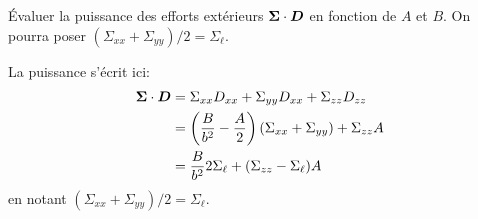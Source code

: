\documentclass[french,12pt]{exam}
\begin{document}
\begin{questions}
%
%



\question \'Evaluer la puissance des efforts extérieurs $\boldsymbol{\Sigma} \cdot \boldsymbol{D}$ en fonction de $A$ et $B$. On pourra poser $(\Sigma_{xx}+\Sigma_{yy})/2= \Sigma_\ell$.
\begin{solution}
La puissance s'écrit ici:
\begin{align*}
\boldsymbol{\Sigma} \cdot \boldsymbol{D} &= \Sigma_{xx}D_{xx}+\Sigma_{yy}D_{xx}+\Sigma_{zz}D_{zz}\\
&= \left(\dfrac{B}{b^2}- \dfrac{A}{2}\right)(\Sigma_{xx}+\Sigma_{yy})+\Sigma_{zz}A \\
&= \dfrac{B}{b^2}2\Sigma_\ell + (\Sigma_{zz}-\Sigma_\ell)A
\end{align*} en notant $(\Sigma_{xx}+\Sigma_{yy})/2= \Sigma_\ell$.
\end{solution}


\end{questions}
\end{document}
